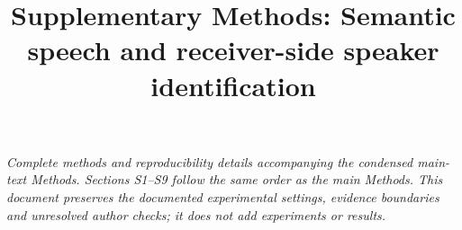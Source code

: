 \documentclass[final,5p,times,twocolumn]{elsarticle}
\begin{document}
\begin{frontmatter}
\title{Supplementary Methods: Semantic speech and receiver-side speaker identification}
\end{frontmatter}

\noindent\textit{Complete methods and reproducibility details accompanying the condensed main-text Methods. Sections S1--S9 follow the same order as the main Methods. This document preserves the documented experimental settings, evidence boundaries and unresolved author checks; it does not add experiments or results.}



\end{document}
